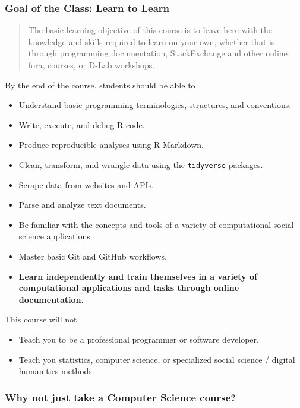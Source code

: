 \documentclass[]{book}
\providecommand{\tightlist}{%
  \setlength{\itemsep}{0pt}\setlength{\parskip}{0pt}}
\begin{document}
\subsubsection*{Goal of the Class: Learn to
Learn}\label{goal-of-the-class-learn-to-learn}

\begin{quote}
The basic learning objective of this course is to leave here with the
knowledge and skills required to learn on your own, whether that is
through programming documentation, StackExchange and other online fora,
courses, or D-Lab workshops.
\end{quote}

By the end of the course, students should be able to

\begin{itemize}
\tightlist
\item
  Understand basic programming terminologies, structures, and
  conventions.
\item
  Write, execute, and debug R code.
\item
  Produce reproducible analyses using R Markdown.
\item
  Clean, transform, and wrangle data using the \texttt{tidyverse}
  packages.
\item
  Scrape data from websites and APIs.
\item
  Parse and analyze text documents.
\item
  Be familiar with the concepts and tools of a variety of computational
  social science applications.
\item
  Master basic Git and GitHub workflows.
\item
  \textbf{Learn independently and train themselves in a variety of
  computational applications and tasks through online documentation.}
\end{itemize}

This course will not

\begin{itemize}
\tightlist
\item
  Teach you to be a professional programmer or software developer.
\item
  Teach you statistics, computer science, or specialized social science
  / digital humanities methods.
\end{itemize}

\subsubsection*{Why not just take a Computer Science
course?}\label{why-not-just-take-a-computer-science-course}
\end{document}
